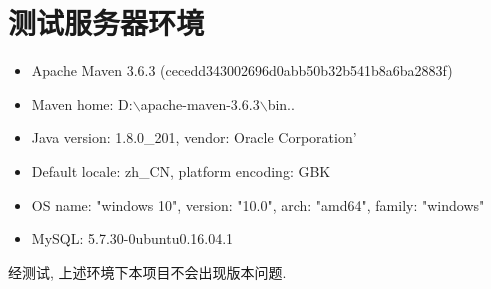\chapter{测试服务器环境}

\begin{itemize}
    \item Apache Maven 3.6.3 (cecedd343002696d0abb50b32b541b8a6ba2883f)
    \item Maven home: D:$\backslash$apache-maven-3.6.3$\backslash$bin..
    \item  Java version: 1.8.0\_201, vendor: Oracle Corporation'
    \item Default locale: zh\_CN, platform encoding: GBK
    \item OS name: "windows 10", version: "10.0", arch: "amd64", family: "windows"
    \item MySQL: 5.7.30-0ubuntu0.16.04.1
\end{itemize}

经测试, 上述环境下本项目不会出现版本问题.